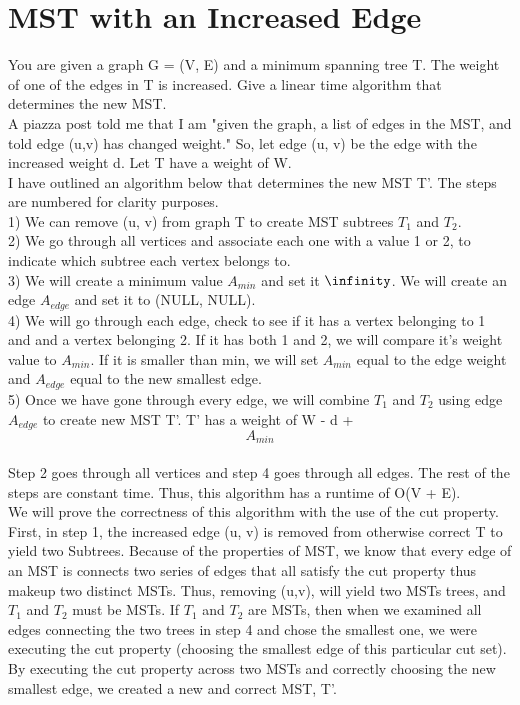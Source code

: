 \documentclass[11pt, solution, letterpaper]{format}
\begin{document}
\clearpage

\section{MST with an Increased Edge}
You are given a graph G = (V, E) and a minimum spanning tree T. The weight of one of the edges in T is increased.
Give a linear time algorithm that determines the new MST.\\

A piazza post told me that I am "given the graph, a list of edges in the MST, and told edge (u,v) has changed weight." So, let edge (u, v) be the edge with the increased weight d. Let T have a weight of W. \\

I have outlined an algorithm below that determines the new MST T'. The steps are numbered for clarity purposes. \\
1) We can remove (u, v) from graph T to create MST subtrees $T_1$ and $T_2$. \\
2) We go through all vertices and associate each one with a value 1 or 2, to indicate which subtree each vertex belongs to. \\
3) We will create a minimum value $A_{min}$ and set it $\infinity$. We will create an edge $A_{edge}$ and set it to (NULL, NULL).\\
4) We will go through each edge, check to see if it has a vertex belonging to 1 and and a vertex belonging 2. If it has both 1 and 2, we will compare it's weight value to $A_{min}$. If it is smaller than min, we will set $A_{min}$ equal to the edge weight and $A_{edge}$ equal to the new smallest edge.\\ 5) Once we have gone through every edge, we will combine $T_1$ and $T_2$ using edge $A_{edge}$ to create new MST T'. T' has a weight of W - d + $$A_{min}$$\\

Step 2 goes through all vertices and step 4 goes through all edges. The rest of the steps are constant time. Thus, this algorithm has a runtime of O(V + E).\\

We will prove the correctness of this algorithm with the use of the cut property. First, in step 1, the increased edge (u, v) is removed from otherwise correct T to yield two Subtrees. Because of the properties of MST, we know that every edge of an MST is connects two series of edges that all satisfy the cut property thus makeup two distinct MSTs. Thus, removing (u,v), will yield two MSTs trees, and $T_1$ and $T_2$ must be MSTs. If $T_1$ and $T_2$ are MSTs, then when we examined all edges connecting the two trees in step 4 and chose the smallest one, we were executing the cut property (choosing the smallest edge of this particular cut set). By executing the cut property across two MSTs and correctly choosing the new smallest edge, we created a new and correct MST, T'. \\
\clearpage
\end{document}

